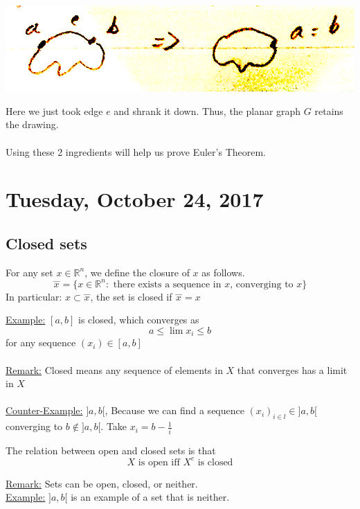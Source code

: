 \documentclass[12pt]{article}
\begin{document}
\includegraphics[scale=0.75]{lec10}

Here we just took edge $e$ and shrank it down. Thus, the planar graph $G$ retains the drawing.\\
\\
Using these 2 ingredients will help us prove Euler's Theorem.

\newpage

\section{Tuesday, October 24, 2017}

\subsection{Closed sets}

\begin{tcolorbox}[title=Definition: Closed Sets]
	For any set $x \in \mathbb{R}^n$, we define the closure of $x$ as follows.
	$$\overset{\_\_\_}{x} = \{ x \in \mathbb{R}^n : \text{ there exists a sequence in $x$, converging to } x \}$$
	In particular: $x\subset \overset{\_\_\_}{x}$, the set is closed if $\overset{\_\_\_}{x} = x$
\end{tcolorbox}

\underline{Example:} $[a,b]$ is closed, which converges as
$$a \leq \lim x_i \leq b$$ for any sequence $(x_i) \in [a,b]$\\
\\
\underline{Remark:} Closed means any sequence of elements in $X$ that converges has a limit in $X$\\
\\
\underline{Counter-Example:} $]a,b[$, Because we can find a sequence $(x_i)_{i\in l} \in ]a,b[$ converging to $b \not\in ]a,b[$. Take $x_i = b - \frac{1}{i}$

\begin{tcolorbox}[title=Relation between open and closed sets]
	The relation between open and closed sets is that
	$$\text{$X$ is open iff $X^c$ is closed}$$
\end{tcolorbox}

\underline{Remark:} Sets can be open, closed, or neither.\\
\underline{Example:} $]a,b[$ is an example of a set that is neither.
\end{document}
